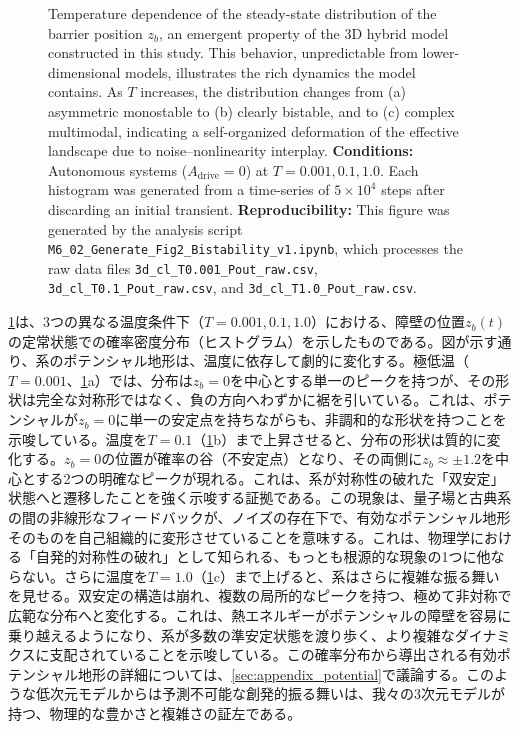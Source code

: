 \documentclass[a4paper,11pt,ja=standard,lualatex]{bxjsarticle}
\newcommand{\figref}[1]{\cref{#1}}
\begin{document}
\begin{figure}[htbp]
{    Temperature dependence of the steady-state distribution of the barrier position $z_b$, an emergent property of the 3D hybrid model constructed in this study. This behavior, unpredictable from lower-dimensional models, illustrates the rich dynamics the model contains. As $T$ increases, the distribution changes from (a) asymmetric monostable to (b) clearly bistable, and to (c) complex multimodal, indicating a self-organized deformation of the effective landscape due to noise--nonlinearity interplay.
    \newline\newline
    \textbf{Conditions:} Autonomous systems ($A_{\mathrm{drive}}=0$) at $T=0.001, 0.1, 1.0$. Each histogram was generated from a time-series of $5 \times 10^4$ steps after discarding an initial transient.
    \textbf{Reproducibility:} This figure was generated by the analysis script \texttt{M6\_02\_Generate\_Fig2\_Bistability\_v1.ipynb}, which processes the raw data files \texttt{3d\_cl\_T0.001\_Pout\_raw.csv}, \texttt{3d\_cl\_T0.1\_Pout\_raw.csv}, and \texttt{3d\_cl\_T1.0\_Pout\_raw.csv}.}
    \label{fig:bistability_histograms}
\end{figure}

\figref{fig:bistability_histograms}は、3つの異なる温度条件下（$T=0.001, 0.1, 1.0$）における、障壁の位置$z_b(t)$の定常状態での確率密度分布（ヒストグラム）を示したものである。図が示す通り、系のポテンシャル地形は、温度に依存して劇的に変化する。極低温（$T=0.001$、\figref{fig:bistability_histograms}a）では、分布は$z_b=0$を中心とする単一のピークを持つが、その形状は完全な対称形ではなく、負の方向へわずかに裾を引いている。これは、ポテンシャルが$z_b=0$に単一の安定点を持ちながらも、非調和的な形状を持つことを示唆している。温度を$T=0.1$（\figref{fig:bistability_histograms}b）まで上昇させると、分布の形状は質的に変化する。$z_b=0$の位置が確率の谷（不安定点）となり、その両側に$z_b \approx \pm 1.2$を中心とする2つの明確なピークが現れる。これは、系が対称性の破れた「\mbox{双安定}」状態へと遷移したことを強く示唆する証拠である。この現象は、量子場と古典系の間の非線形なフィードバックが、ノイズの存在下で、有効なポテンシャル地形そのものを自己組織的に変形させていることを意味する。これは、物理学における「自発的対称性の破れ」として知られる、もっとも根源的な現象の1つに他ならない。さらに温度を$T=1.0$（\figref{fig:bistability_histograms}c）まで上げると、系はさらに複雑な振る舞いを見せる。\mbox{双安定}の構造は崩れ、複数の局所的なピークを持つ、極めて非対称で広範な分布へと変化する。これは、熱エネルギーがポテンシャルの障壁を容易に乗り越えるようになり、系が多数の準安定状態を渡り歩く、より複雑なダイナミクスに支配されていることを示唆している。この確率分布から導出される有効ポテンシャル地形の詳細については、\ref{sec:appendix_potential}で議論する。このような低次元モデルからは予測不可能な\mbox{創発}的振る舞いは、我々の3次元モデルが持つ、物理的な豊かさと複雑さの証左である。
\end{document}
